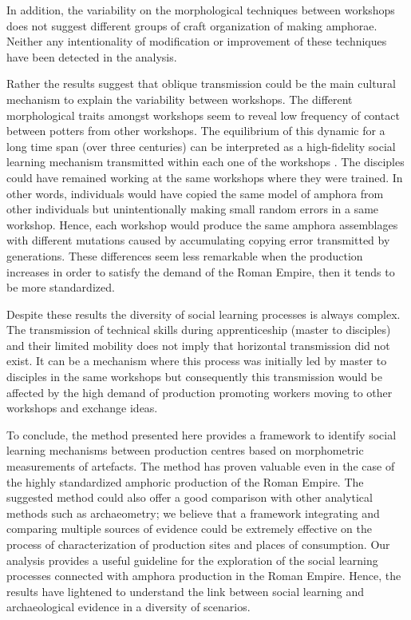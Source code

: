 \documentclass[review]{elsarticle}
\begin{document}
In addition, the variability on the morphological techniques between workshops does not suggest different groups of craft organization of making amphorae. Neither any intentionality of modification or improvement of these techniques have been detected in the analysis. 

Rather the results suggest that oblique transmission could be the main cultural mechanism to explain the variability between workshops. The different morphological traits amongst workshops seem to reveal low frequency of contact between potters from other workshops. The equilibrium of this dynamic for a long time span (over three centuries) can be interpreted as a high-fidelity social learning mechanism transmitted within each one of the workshops \citep{schillinger_copying_2016}. The disciples could have remained working at the same workshops where they were trained. In other words, individuals would have copied the same model of amphora from other individuals but unintentionally making small random errors in a same workshop. Hence, each workshop would produce the same amphora assemblages with different mutations caused by accumulating copying error transmitted by generations. These differences seem less remarkable when the production increases in order to satisfy the demand of the Roman Empire, then it tends to be more standardized. 

Despite these results the diversity of social learning processes is always complex. The transmission of technical skills during apprenticeship (master to disciples) and their limited mobility does not imply that horizontal transmission did not exist. It can be a mechanism where this process was initially led by master to disciples in the same workshops but consequently this transmission would be affected by the high demand of production promoting workers moving to other workshops and exchange ideas. 

To conclude, the method presented here provides a framework to identify social learning mechanisms between production centres based on morphometric measurements of artefacts. The method has proven valuable even in the case of the highly standardized amphoric production of the Roman Empire. The suggested method could also offer a good comparison with other analytical methods such as archaeometry; we believe that a framework integrating and comparing multiple sources of evidence could be extremely effective on the process of characterization of production sites and places of consumption. Our analysis provides a useful guideline for the exploration of the social learning processes connected with amphora production in the Roman Empire. Hence, the results have lightened to understand the link between social learning and archaeological evidence in a diversity of scenarios. 
 
\end{document}
